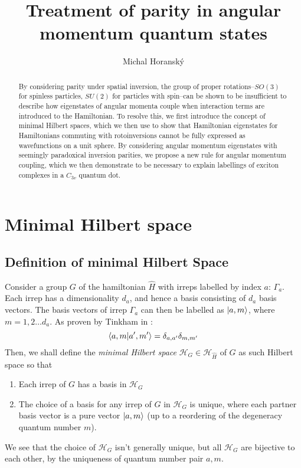 \documentclass[12pt]{article}
\begin{document}
	\title{Treatment of parity in angular momentum quantum states}
	\author{Michal Horanský}
	\maketitle
	
	\begin{abstract}
	By considering parity under spatial inversion, the group of proper rotations--$SO(3)$ for spinless particles, $SU(2)$ for particles with spin--can be shown to be insufficient to describe how eigenstates of angular momenta couple when interaction terms are introduced to the Hamiltonian. To resolve this, we first introduce the concept of minimal Hilbert spaces, which we then use to show that Hamiltonian eigenstates for Hamiltonians commuting with rotoinversions cannot be fully expressed as wavefunctions on a unit sphere. By considering angular momentum eigenstates with seemingly paradoxical inversion parities, we propose a new rule for angular momentum coupling, which we then demonstrate to be necessary to explain labellings of exciton complexes in a $C_{3v}$ quantum dot.
	\end{abstract}
	
	\section{Minimal Hilbert space}
	
	\subsection{Definition of minimal Hilbert Space}
	
	Consider a group $G$ of the hamiltonian $\hat{H}$ with irreps labelled by index $a$: $\Gamma_a$. Each irrep has a dimensionality $d_a$, and hence a basis consisting of $d_a$ basis vectors. The basis vectors of irrep $\Gamma_a$ can then be labelled as $\ket{a,m}$, where $m=1,2\dots d_a$. As proven by Tinkham in \cite[p.41-2]{tinkham}:
	$$\braket{a,m}{a',m'}=\delta_{a,a'}\delta_{m,m'}$$
	Then, we shall define the \textit{minimal Hilbert space} $\mathcal{H}_G\in\mathcal{H}_{\hat{H}}$ of $G$ as such Hilbert space so that
	\begin{enumerate}
	\item Each irrep of $G$ has a basis in $\mathcal{H}_G$
	\item The choice of a basis for any irrep of $G$ in $\mathcal{H}_G$ is unique, where each partner basis vector is a pure vector $\ket{a,m}$ (up to a reordering of the degeneracy quantum number $m$).
	\end{enumerate}
	We see that the choice of $\mathcal{H}_G$ isn't generally unique, but all $\mathcal{H}_G$ are bijective to each other, by the uniqueness of quantum number pair $a,m$.
	
\end{document}
